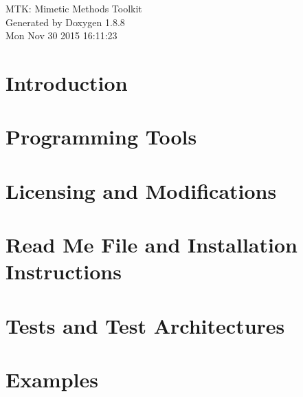 \documentclass[twoside]{book}
\newcommand{\+}{\discretionary{\mbox{\scriptsize$\hookleftarrow$}}{}{}}
\newcommand{\clearemptydoublepage}{%
  \newpage{\pagestyle{empty}\cleardoublepage}%
}
\begin{document}
\hypersetup{pageanchor=false,
             bookmarks=true,
             bookmarksnumbered=true,
             pdfencoding=unicode
            }
\begin{titlepage}
\vspace*{7cm}
\begin{center}%
{\Large M\+T\+K\+: Mimetic Methods Toolkit }\\
\vspace*{1cm}
{\large Generated by Doxygen 1.8.8}\\
\vspace*{0.5cm}
{\small Mon Nov 30 2015 16:11:23}\\
\end{center}
\end{titlepage}
\clearemptydoublepage
\tableofcontents
\clearemptydoublepage
{}
\hypersetup{pageanchor=true}

\chapter{Introduction}
\label{index}\hypertarget{index}{}
\chapter{Programming Tools}
\label{section_prog_tools}
\hypertarget{section_prog_tools}{}

\chapter{Licensing and Modifications}
\label{section_license_mod}
\hypertarget{section_license_mod}{}

\chapter{Read Me File and Installation Instructions}
\label{page_readme}
\hypertarget{page_readme}{}

\chapter{Tests and Test Architectures}
\label{page_architectures}
\hypertarget{page_architectures}{}

\chapter{Examples}
\label{page_examples}
\hypertarget{page_examples}{}

\end{document}
